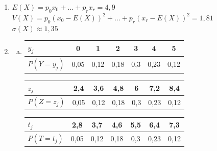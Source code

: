 \documentclass[12pt, a4paper]{article}
\begin{document}
    \begin{Exercise}[number={51}]
      \begin{enumerate}[1)]
        \item $E(X)=p_0x_0+\dots+p_rx_r=4{,}9$ \\ $V(X)=p_0(x_0-E(X))^2+\dots+p_r(x_r-E(X))^2=1{,}81$ \\ $\sigma(X)\approx 1{,}35$
        \item \begin{enumerate}[a)]
              \item \hfill\begin{tabular}[t]{ | l || *{6}{c| } }
                      \firsthline
                      $y_j$                     & 0      & 1      & 2      & 3     & 4      & 5      \\ \hline
                      $P(Y=y_j)$ \hspace{0.5cm} & 0{,}05 & 0{,}12 & 0{,}18 & 0{,}3 & 0{,}23 & 0{,}12 \\ \hline
                    \end{tabular}\hfill\mbox{}\medbreak
                    \parbox{\linewidth}{}

                    \begin{center}\begin{tabular}{ | l || *{6}{c| } }
                      \hline
                      $z_j$                     & 2{,}4  & 3{,}6  & 4{,}8  & 6     & 7{,}2  & 8{,}4  \\ \hline
                      $P(Z=z_j)$ \hspace{0.5cm} & 0{,}05 & 0{,}12 & 0{,}18 & 0{,}3 & 0{,}23 & 0{,}12 \\ \hline
                    \end{tabular}\end{center}
                    \parbox{\linewidth}{}

                    \break
                    
                    \begin{center}\begin{tabular}{ | l || *{6}{c| } }
                      \hline
                      $t_j$                     & 2{,}8  & 3{,}7  & 4{,}6  & 5{,}5 & 6{,}4  & 7{,}3  \\ \hline
                      $P(T=t_j)$ \hspace{0.5cm} & 0{,}05 & 0{,}12 & 0{,}18 & 0{,}3 & 0{,}23 & 0{,}12 \\ \hline
                    \end{tabular}\end{center} 
                    \parbox{\linewidth}{}


\end{enumerate}
\end{enumerate}
\end{Exercise}
\end{document}
